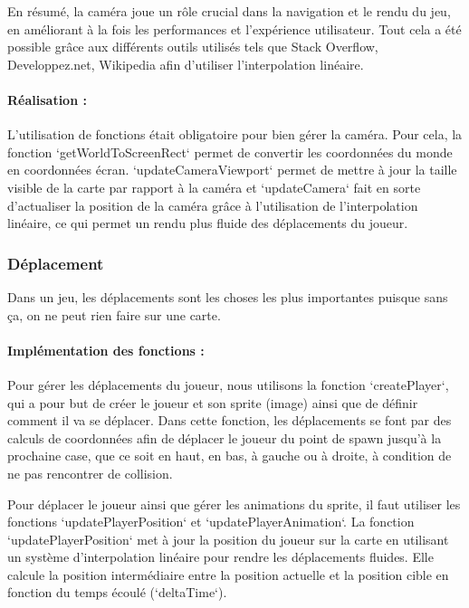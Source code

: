 \documentclass[12pt,a4paper, twoside]{article}
\begin{document}
    En résumé, la caméra joue un rôle crucial dans la navigation et le rendu du jeu, en améliorant à la fois les performances et l'expérience utilisateur.
    Tout cela a été possible grâce aux différents outils utilisés tels que Stack Overflow, Developpez.net, Wikipedia afin d'utiliser l'interpolation linéaire.
    \paragraph{Réalisation : }
    L'utilisation de fonctions était obligatoire pour bien gérer la caméra. Pour cela, la fonction `getWorldToScreenRect` permet de convertir les coordonnées du monde en coordonnées écran.
    `updateCameraViewport` permet de mettre à jour la taille visible de la carte par rapport à la caméra et `updateCamera` fait en sorte d'actualiser la position de la caméra grâce à l'utilisation de l'interpolation linéaire,
    ce qui permet un rendu plus fluide des déplacements du joueur.

    \newpage
    \subsubsection{Déplacement}

    Dans un jeu, les déplacements sont les choses les plus importantes puisque sans ça, on ne peut rien faire sur une carte.

    \paragraph{Implémentation des fonctions : }

    Pour gérer les déplacements du joueur, nous utilisons la fonction `createPlayer`, qui a pour but de créer le joueur et son sprite (image) ainsi que de définir comment il va se déplacer. Dans cette fonction, les déplacements se font par des calculs de coordonnées afin de déplacer le joueur du point de spawn jusqu'à la prochaine case, que ce soit en haut, en bas, à gauche ou à droite, à condition de ne pas rencontrer de collision.
    \newline

    Pour déplacer le joueur ainsi que gérer les animations du sprite, il faut utiliser les fonctions `updatePlayerPosition` et `updatePlayerAnimation`. La fonction `updatePlayerPosition` met à jour la position du joueur sur la carte en utilisant un système d'interpolation linéaire pour rendre les déplacements fluides. Elle calcule la position intermédiaire entre la position actuelle et la position cible en fonction du temps écoulé (`deltaTime`).
    \newline
\end{document}
